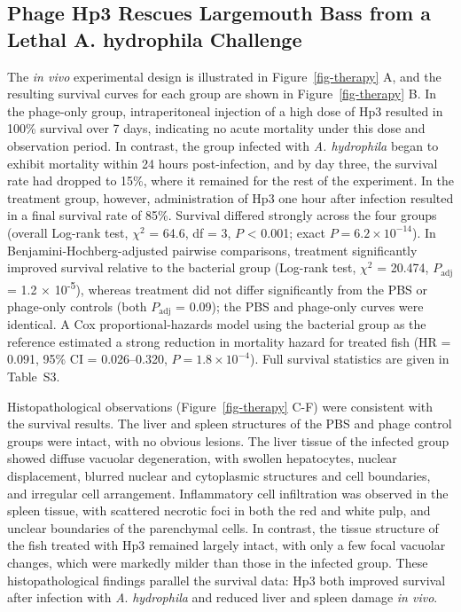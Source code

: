 \subsection{Phage Hp3 Rescues Largemouth Bass from a Lethal A.
hydrophila
Challenge}\label{phage-hp3-rescues-largemouth-bass-from-a-lethal-a.-hydrophila-challenge}

The \emph{in vivo} experimental design is illustrated in
Figure~\ref{fig-therapy} A, and the resulting survival curves for each
group are shown in Figure~\ref{fig-therapy} B. In the phage-only group,
intraperitoneal injection of a high dose of Hp3 resulted in 100\%
survival over 7 days, indicating no acute mortality under this dose
and observation period. In contrast, the group infected with
\emph{A. hydrophila} began to exhibit mortality within 24 hours
post-infection, and by day three, the survival rate had dropped to
15\%, where it remained for the rest of the experiment. In the treatment
group, however, administration of Hp3 one hour after infection resulted
in a final survival rate of 85\%. Survival differed strongly across the
four groups (overall Log-rank test, \(\chi^2\) = 64.6, df = 3,
\(P\) \textless{} 0.001; exact \(P = 6.2 \times 10^{-14}\)). In
Benjamini-Hochberg-adjusted pairwise comparisons, treatment significantly
improved survival relative to the bacterial group (Log-rank test,
\(\chi^2\) = 20.474, \(P_{\mathrm{adj}}\) = 1.2 ×
10\textsuperscript{-5}), whereas treatment did not differ significantly
from the PBS or phage-only controls (both \(P_{\mathrm{adj}}\) = 0.09);
the PBS and phage-only curves were identical. A Cox proportional-hazards
model using the bacterial group as the reference estimated a strong
reduction in mortality hazard for treated fish (HR = 0.091, 95\% CI =
0.026--0.320, \(P = 1.8 \times 10^{-4}\)). Full survival statistics are
given in Table~S3.

Histopathological observations (Figure~\ref{fig-therapy} C-F) were
consistent with the survival results. The liver and spleen structures of
the PBS and phage control groups were intact, with no obvious lesions.
The liver tissue of the infected group showed diffuse vacuolar
degeneration, with swollen hepatocytes, nuclear displacement, blurred
nuclear and cytoplasmic structures and cell boundaries, and irregular
cell arrangement. Inflammatory cell infiltration was observed in the
spleen tissue, with scattered necrotic foci in both the red and white
pulp, and unclear boundaries of the parenchymal cells. In contrast, the
tissue structure of the fish treated with Hp3 remained largely intact,
with only a few focal vacuolar changes, which were markedly milder
than those in the infected group. These histopathological findings
parallel the survival data: Hp3 both improved survival after infection
with \emph{A}. \emph{hydrophila} and reduced liver and spleen damage
\emph{in vivo}.

